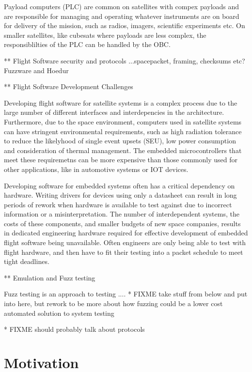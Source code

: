 \documentclass[../report.tex]{subfiles}
\begin{document}
Payload computers (PLC) are common on satellites with compex payloads and are
responsible for managing and operating whatever instruments are on board for
delivery of the mission, such as radios, imagers, scientific experiments etc.
On smaller satellites, like cubesats where payloads are less complex, the
responsiblilties of the PLC can be handled by the OBC.

** Flight Software security and protocols
...spacepacket, framing, checksums etc? Fuzzware and Hoedur

** Flight Software Development Challenges

Developing flight software for satellite systems is a complex process due to
the large number of different interfaces and interdepencies in the
architecture. Furthermore, due to the space environment, computers used in
satellite systems can have stringent environmental requirements, such as high
radiation tolerance to reduce the likelyhood of single event upsets (SEU), low
power consumption and consideration of thermal management. The embedded
microcontrollers that meet these requiremetns can be more expensive than those
commonly used for other applications, like in automotive systems or IOT devices.

Developing software for embedded systems often has a critical dependency on
hardware. Writing drivers for devices using only a datasheet can result in long
periods of rework when hardware is available to test against due to incorrect
information or a misinterpretation. The number of interdependent systems, the
costs of these components, and smaller budgets of new space companies, results
in dedicated engineering hardware required for effective development of
embedded flight software being unavailable. Often engineers are only being able
to test with flight hardware, and then have to fit their testing into a packet
schedule to meet tight deadlines.



** Emulation and Fuzz testing

Fuzz testing is an approach to testing ....
* FIXME take stuff from below and put into here, but rework to be more about how fuzzing could be a lower cost automated solution to system testing

* FIXME should probably talk about protocols

\section{Motivation}
\end{document}
